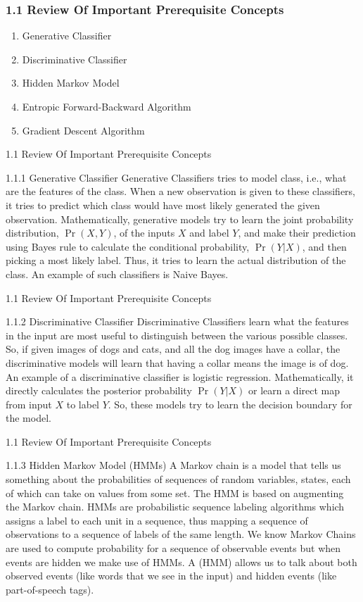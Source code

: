 \documentclass{beamer}
\providecommand{\pr}[1]{\ensuremath{\Pr\left(#1\right)}}
\begin{document}
\begin{frame}
\frametitle{1.1 Review Of Important Prerequisite Concepts}
\begin{enumerate}
    \item Generative Classifier
    \item Discriminative Classifier
    \item Hidden Markov Model
    \item Entropic Forward-Backward Algorithm
    \item Gradient Descent Algorithm
\end{enumerate}
\end{frame}
\begin{frame}{1.1 Review Of Important Prerequisite Concepts}
\begin{block}{1.1.1 Generative Classifier}
Generative Classifiers tries to model class, i.e., what are the features of the class. When a new observation is given to these classifiers, it tries to predict which class would have most likely generated the given observation. Mathematically, generative models try to learn the joint probability distribution, $\pr{X, Y}$, of the inputs $X$ and label $Y$, and make their prediction using Bayes rule to calculate the conditional probability, $\pr{Y|X}$, and then picking a most likely label. Thus, it tries to learn the actual distribution of the class. An example of such classifiers is Naive Bayes.
\end{block}
\end{frame}
\begin{frame}{1.1 Review Of Important Prerequisite Concepts}
\begin{block}{1.1.2 Discriminative Classifier}
Discriminative Classifiers learn what the features in the input are most useful to distinguish between the various possible classes. So, if given images of dogs and cats, and all the dog images have a collar, the discriminative models will learn that having a collar means the image is of dog. An example of a discriminative classifier is logistic regression. Mathematically, it directly calculates the posterior probability $\pr{Y|X}$ or learn a direct map from input $X$ to label $Y$. So, these models try to learn the decision boundary for the model.
\end{block}
\end{frame}
\begin{frame}{1.1 Review Of Important Prerequisite Concepts}
\begin{block}{1.1.3 Hidden Markov Model (HMMs)}
A Markov chain is a model that tells us something about the probabilities of sequences of random variables, states, each of which can take on values from some set. The HMM is based on augmenting the Markov chain. HMMs are probabilistic sequence labeling algorithms which assigns a label to each unit in a sequence, thus mapping a sequence of observations to a sequence of labels of the same length. We know Markov Chains are used to compute probability for a sequence of observable events but when events are hidden we make use of HMMs. A (HMM) allows us to talk about both observed events (like words that we see in the input) and hidden events (like part-of-speech tags).
\end{block}
\end{frame}
\end{document}

